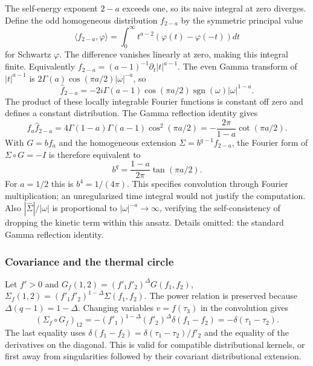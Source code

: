 \documentclass[11pt]{article}
\numberwithin{equation}{section}
\theoremstyle{exposition}
\theoremstyle{result}
\newcommand{\sgn}{\operatorname{sgn}}
\begin{document}
The self-energy exponent $2-a$ exceeds one, so its naive integral at zero diverges. Define the odd homogeneous distribution $f_{2-a}$ by the symmetric principal value
\begin{equation*}
\langle f_{2-a},\varphi\rangle
=\int_0^\infty t^{a-2}(\varphi(t)-\varphi(-t))dt
\end{equation*}
for Schwartz $\varphi$. The difference vanishes linearly at zero, making this integral finite. Equivalently $f_{2-a}=(a-1)^{-1}\partial_t|t|^{a-1}$. The even Gamma transform of $|t|^{a-1}$ is $2\Gamma(a)\cos(\pi a/2)|\omega|^{-a}$, so
\begin{equation*}
\widehat f_{2-a}
=-2i\Gamma(a-1)\cos(\pi a/2)\sgn(\omega)|\omega|^{1-a}.
\end{equation*}
The product of these locally integrable Fourier functions is constant off zero and defines a constant distribution. The Gamma reflection identity gives
\begin{equation*}
\widehat f_a\widehat f_{2-a}
=4\Gamma(1-a)\Gamma(a-1)\cos^2(\pi a/2)
=-\frac{2\pi}{1-a}\cot(\pi a/2).
\end{equation*}
With $G=bf_a$ and the homogeneous extension $\Sigma=b^{q-1}f_{2-a}$, the Fourier form of $\Sigma\circ G=-I$ is therefore equivalent to
\begin{equation*}
b^q=\frac{1-a}{2\pi}\tan(\pi a/2).
\end{equation*}
For $a=1/2$ this is $b^4=1/(4\pi)$. This specifies convolution through Fourier multiplication; an unregularized time integral would not justify the computation. Also $|\widehat\Sigma|/|\omega|$ is proportional to $|\omega|^{-a}\to\infty$, verifying the self-consistency of dropping the kinetic term within this ansatz. Details omitted: the standard Gamma reflection identity.

\subsubsection{Covariance and the thermal circle}
Let $f'>0$ and $G_f(1,2)=(f'_1f'_2)^\Delta G(f_1,f_2)$, $\Sigma_f(1,2)=(f'_1f'_2)^{1-\Delta}\Sigma(f_1,f_2)$. The power relation is preserved because $\Delta(q-1)=1-\Delta$. Changing variables $v=f(\tau_3)$ in the convolution gives
\begin{equation*}
(\Sigma_f\circ G_f)_{12}
=-(f'_1)^{1-\Delta}(f'_2)^\Delta\delta(f_1-f_2)
=-\delta(\tau_1-\tau_2).
\end{equation*}
The last equality uses $\delta(f_1-f_2)=\delta(\tau_1-\tau_2)/f'_2$ and the equality of the derivatives on the diagonal. This is valid for compatible distributional kernels, or first away from singularities followed by their covariant distributional extension.
\end{document}
